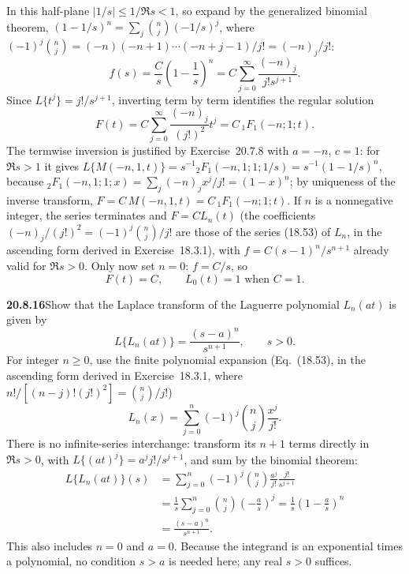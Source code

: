 In this half-plane $|1/s|\le1/\Re s<1$, so expand by the
generalized
binomial theorem,
$(1-1/s)^n=\sum_j\binom nj(-1/s)^j$, where
$(-1)^j\binom nj=(-n)(-n+1)\cdots(-n+j-1)/j!=(-n)_j/j!$:
\[
f(s)=\frac C s\left(1-\frac1s\right)^n
=C\sum_{j=0}^\infty\frac{(-n)_j}{j!s^{j+1}}.
\]
Since $L\{t^j\}=j!/s^{j+1}$, inverting term by term identifies
the regular solution
\[
\boxed{F(t)=C\sum_{j=0}^\infty\frac{(-n)_j}{(j!)^2}t^j
=C\,{}_1F_1(-n;1;t)}.
\]
The termwise inversion is justified by Exercise~20.7.8 with
$a=-n$, $c=1$: for $\Re s>1$ it gives
$L\{M(-n,1,t)\}=s^{-1}{}_2F_1(-n,1;1;1/s)=s^{-1}(1-1/s)^n$,
because ${}_2F_1(-n,1;1;x)=\sum_j(-n)_jx^j/j!=(1-x)^n$; by
uniqueness of the inverse transform,
$F=C\,M(-n,1,t)=C\,{}_1F_1(-n;1;t)$.
If $n$ is a nonnegative
integer, the series terminates and $F=C L_n(t)$ (the
coefficients $(-n)_j/(j!)^2=(-1)^j\binom nj/j!$ are those of
the series (18.53) of $L_n$, in the ascending form derived in
Exercise~18.3.1), with
$f=C(s-1)^n/s^{n+1}$ already valid for $\Re s>0$.
Only now set $n=0$: $f=C/s$, so
\[
\boxed{F(t)=C,\qquad L_0(t)=1\text{ when }C=1}.
\]

\par\bigskip
\noindent\textbf{20.8.16}\quad Show that the Laplace transform of
the Laguerre polynomial $L_{n}(at)$ is given by
\[
L\{L_{n}(at)\}=\frac{(s-a)^{n}}{s^{n+1}},\qquad s>0.
\]
\solution
For integer $n\ge0$, use the finite polynomial expansion
(Eq.~(18.53), in the ascending form derived in
Exercise~18.3.1, where
$n!/[(n-j)!(j!)^2]=\binom nj/j!$)
\[
L_n(x)=\sum_{j=0}^n(-1)^j\binom nj\frac{x^j}{j!}.
\]
There is no infinite-series interchange: transform its $n+1$
terms directly in $\Re s>0$, with
$L\{(at)^j\}=a^jj!/s^{j+1}$, and sum by the binomial theorem:
\begin{align*}
L\{L_n(at)\}(s)
&=\sum_{j=0}^n(-1)^j\binom nj\frac{a^j}{j!}
\frac{j!}{s^{j+1}}\\
&=\frac1s\sum_{j=0}^n\binom nj\left(-\frac a s\right)^j
=\frac1s\left(1-\frac a s\right)^n\\
&=\boxed{\frac{(s-a)^n}{s^{n+1}}}.
\end{align*}
This also includes $n=0$ and $a=0$. Because the integrand is
an exponential times a polynomial, no condition $s>a$ is
needed here; any real $s>0$ suffices.

